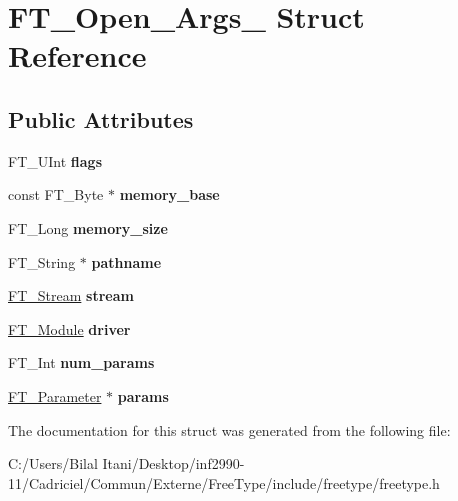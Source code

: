 \hypertarget{struct_f_t___open___args__}{}\section{F\+T\+\_\+\+Open\+\_\+\+Args\+\_\+ Struct Reference}
\label{struct_f_t___open___args__}
\subsection*{Public Attributes}
\begin{DoxyCompactItemize}
\item 
F\+T\+\_\+\+U\+Int {\bfseries flags}\hypertarget{struct_f_t___open___args___a2e3e6b9284fe8b4d9833e247a19181fa}{}\label{struct_f_t___open___args___a2e3e6b9284fe8b4d9833e247a19181fa}

\item 
const F\+T\+\_\+\+Byte $\ast$ {\bfseries memory\+\_\+base}\hypertarget{struct_f_t___open___args___a1231da51bc58922096b3bc603bb2ffb0}{}\label{struct_f_t___open___args___a1231da51bc58922096b3bc603bb2ffb0}

\item 
F\+T\+\_\+\+Long {\bfseries memory\+\_\+size}\hypertarget{struct_f_t___open___args___a87f0bb2f257abe94c93a79e0de3525da}{}\label{struct_f_t___open___args___a87f0bb2f257abe94c93a79e0de3525da}

\item 
F\+T\+\_\+\+String $\ast$ {\bfseries pathname}\hypertarget{struct_f_t___open___args___aea3d454d9fd9bb7434aad07e651d027b}{}\label{struct_f_t___open___args___aea3d454d9fd9bb7434aad07e651d027b}

\item 
\hyperlink{struct_f_t___stream_rec__}{F\+T\+\_\+\+Stream} {\bfseries stream}\hypertarget{struct_f_t___open___args___ae1e6444bf0c21b323ce6cbe8bc475b2b}{}\label{struct_f_t___open___args___ae1e6444bf0c21b323ce6cbe8bc475b2b}

\item 
\hyperlink{struct_f_t___module_rec__}{F\+T\+\_\+\+Module} {\bfseries driver}\hypertarget{struct_f_t___open___args___a7c01bd7e34a440c3e89141ee521e2646}{}\label{struct_f_t___open___args___a7c01bd7e34a440c3e89141ee521e2646}

\item 
F\+T\+\_\+\+Int {\bfseries num\+\_\+params}\hypertarget{struct_f_t___open___args___afaf47d9e1631f2147b696fd7f5a6f4eb}{}\label{struct_f_t___open___args___afaf47d9e1631f2147b696fd7f5a6f4eb}

\item 
\hyperlink{struct_f_t___parameter__}{F\+T\+\_\+\+Parameter} $\ast$ {\bfseries params}\hypertarget{struct_f_t___open___args___a77b279a34beba29bc14901926f79818f}{}\label{struct_f_t___open___args___a77b279a34beba29bc14901926f79818f}

\end{DoxyCompactItemize}


The documentation for this struct was generated from the following file\+:\begin{DoxyCompactItemize}
\item 
C\+:/\+Users/\+Bilal Itani/\+Desktop/inf2990-\/11/\+Cadriciel/\+Commun/\+Externe/\+Free\+Type/include/freetype/freetype.\+h\end{DoxyCompactItemize}
